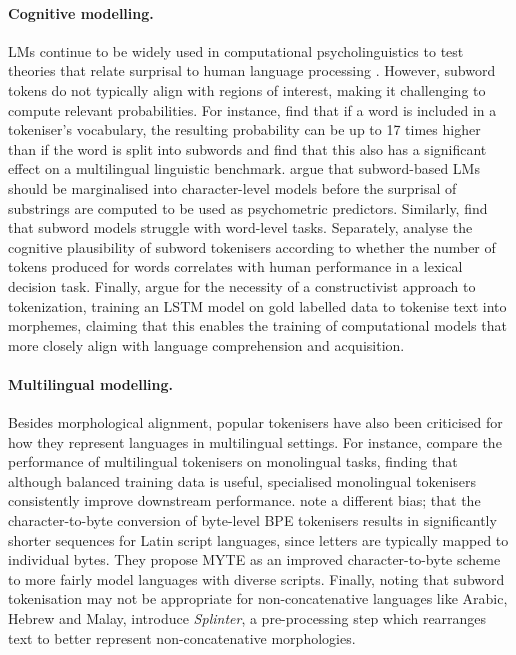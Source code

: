 \paragraph{Cognitive modelling.} LMs continue to be widely used in computational psycholinguistics to test theories that relate surprisal to human language processing \citep{shain2024}. However, subword tokens do not typically align with regions of interest, making it challenging to compute relevant probabilities. For instance, \citet{lesci2025causal} find that if a word is included in a tokeniser's vocabulary, the resulting probability can be up to 17 times higher than if the word is split into subwords and \citet{jumelet2025multiblimp10massivelymultilingual} find that this also has a significant effect on a multilingual linguistic benchmark. \citet{giulianelli-etal-2024-proper} argue that subword-based LMs should be marginalised into character-level models before the surprisal of substrings are computed to be used as psychometric predictors. Similarly, \citet{bunzeck2025subwordmodelsstruggleword} find that subword models struggle with word-level tasks. Separately, \citet{beinborn-pinter-2023-analyzing} analyse the cognitive plausibility of subword tokenisers according to whether the number of tokens produced for words correlates with human performance in a lexical decision task. Finally, \citet{fan-sun-2023-constructivist} argue for the necessity of a constructivist approach to tokenization, training an LSTM model on gold labelled data to tokenise text into morphemes, claiming that this enables the training of computational models that more closely align with language comprehension and acquisition. 

\paragraph{Multilingual modelling.} Besides morphological alignment, popular tokenisers have also been criticised for how they represent languages in multilingual settings. For instance, \citet{rust-etal-2021} compare the performance of multilingual tokenisers on monolingual tasks, finding that although balanced training data is useful, specialised monolingual tokenisers consistently improve downstream performance. \citet{limisiewicz-etal-2024-myte} note a different bias; that the character-to-byte conversion of byte-level BPE tokenisers results in significantly shorter sequences for Latin script languages, since letters are typically mapped to individual bytes. They propose MYTE as an improved character-to-byte scheme to more fairly model languages with diverse scripts. Finally, noting that subword tokenisation may not be appropriate for non-concatenative languages like Arabic, Hebrew and Malay, \citet{gazit2025splinteringnonconcatenativelanguagesbetter} introduce \emph{Splinter}, a pre-processing step which rearranges text to better represent non-concatenative morphologies.

